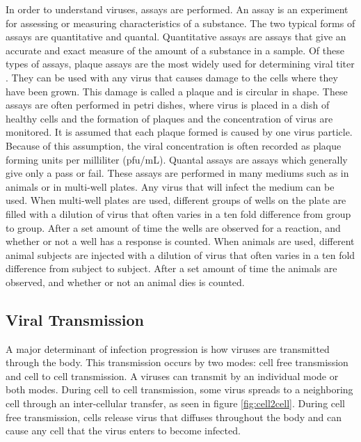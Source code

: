 \documentclass[a4paper]{article}
\begin{document}
In order to understand viruses, assays are performed. An assay is an experiment for assessing or measuring characteristics of a substance. The two typical forms of assays are quantitative and quantal. Quantitative assays are assays that give an accurate and exact measure of the amount of a substance in a sample. Of these types of assays, plaque assays are the most widely used for determining viral titer \cite{Kumar}. They can be used with any virus that causes damage to the cells where they have been grown. This damage is called a plaque and is circular in shape. These assays are often performed in petri dishes, where virus is placed in a dish of healthy cells and the formation of plaques and the concentration of virus are monitored. It is assumed that each plaque formed is caused by one virus particle. Because of this assumption, the viral concentration is often recorded as plaque forming units per milliliter (pfu/mL). Quantal assays are assays which generally give only a pass or fail. These assays are performed in many mediums such as in animals or in multi-well plates. Any virus that will infect the medium can be used. When multi-well plates are used, different groups of wells on the plate are filled with a dilution of virus that often varies in a ten fold difference from group to group. After a set amount of time the wells are observed for a reaction, and whether or not a well has a response is counted. When animals are used, different animal subjects are injected with a dilution of virus that often varies in a ten fold difference from subject to subject. After a set amount of time the animals are observed, and whether or not an animal dies is counted.

\subsection{Viral Transmission}

A major determinant of infection progression is how viruses are transmitted through the body. This transmission occurs by two modes: cell free transmission and cell to cell transmission. A viruses can transmit by an individual mode or both modes. During cell to cell transmission, some virus spreads to a neighboring cell through an inter-cellular transfer, as seen in figure \ref{fig:cell2cell}. During cell free transmission, cells release virus that diffuses throughout the body and can cause any cell that the virus enters to become infected.
\end{document}
